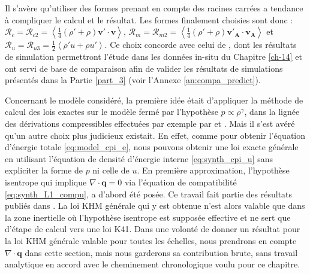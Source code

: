 Il s'avère qu'utiliser des formes prenant en compte des racines carrées a tendance à compliquer le calcul et le résultat. Les formes finalement choisies sont donc : $\mathcal{R}_{c} = \mathcal{R}_{c2} = \left<\frac{1}{4} \left(\rho'+\rho\right) \boldsymbol{v'} \cdot  \boldsymbol{v} \right>$, $\mathcal{R}_{m} = \mathcal{R}_{m2} = \left<\frac{1}{4} \left(\rho'+\rho\right) \boldsymbol{v'_A} \cdot  \boldsymbol{v_A} \right>$ et $\mathcal{R}_{u} = \mathcal{R}_{u3} = \frac{1}{2}\left< \rho' u + \rho u'\right> $. Ce choix concorde avec celui de \cite{andres_energy_2018}, dont les résultats de simulation permettront l'étude dans les données in-situ du Chapitre \ref{ch-14} et ont servi de base de comparaison afin de valider les résultats de simulations présentés dans la Partie \ref{part_3} (voir l'Annexe \ref{an:compa_predict}).

Concernant le modèle considéré, la première idée était d'appliquer la méthode de calcul des lois exactes sur le modèle fermé par l'hypothèse $p \propto \rho^{\gamma}$, dans la lignée des dérivations compressibles effectuées par exemple par \cite{galtier_exact_2011} et \cite{andres_alternative_2017}. Mais il s'est avéré qu'un autre choix plus judicieux existait. En effet, comme pour obtenir l'équation d'énergie totale \eqref{eq:model_cpi_e}, nous pouvons obtenir une loi exacte \og générale \fg{} en utilisant l'équation de densité d'énergie interne \eqref{eq:synth_cpi_u} sans expliciter la forme de $p$ ni celle de $u$. En première approximation, l'hypothèse isentrope qui implique $\nabla \cdot \boldsymbol{q} = 0$ via l'équation de compatibilité \eqref{eq:synth_L1_compu}, a d'abord été posée. Ce travail fait partie des résultats publiés dans \cite{simon_general_2021}. La loi \acs{KHM} générale qui y est obtenue n'est alors valable que dans la zone inertielle où l'hypothèse isentrope est supposée effective et ne sert que d'étape de calcul vers une loi \acs{K41}. Dans une volonté de donner un résultat pour la loi \acs{KHM} générale valable pour toutes les échelles, nous prendrons en compte $\nabla \cdot \boldsymbol{q}$ dans cette section, mais nous garderons sa contribution brute, sans travail analytique en accord avec le cheminement chronologique voulu pour ce chapitre. 


